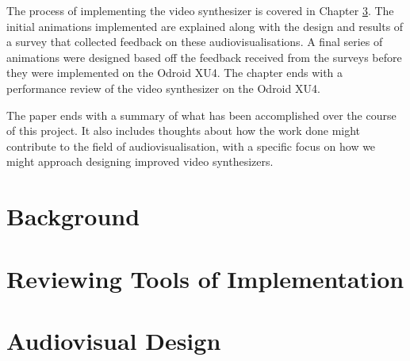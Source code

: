 \documentclass{report}
\begin{document}
The process of implementing the video synthesizer is covered in Chapter \ref{chap:avdesign}. The initial animations implemented are explained along with the design and results of a survey that collected feedback on these audiovisualisations. A final series of animations were designed based off the feedback received from the surveys before they were implemented on the Odroid XU4. The chapter ends with a performance review of the video synthesizer on the Odroid XU4. \par

The paper ends with a summary of what has been accomplished over the course of this project. It also includes thoughts about how the work done might contribute to the field of audiovisualisation, with a specific focus on how we might approach designing improved video synthesizers.


\chapter{Background}\label{chap:background}




\chapter{Reviewing Tools of Implementation}\label{chap:toolreview}



\chapter{Audiovisual Design}\label{chap:avdesign}




\printbibliography

\begin{appendices}
  
\end{appendices}
\end{document}
